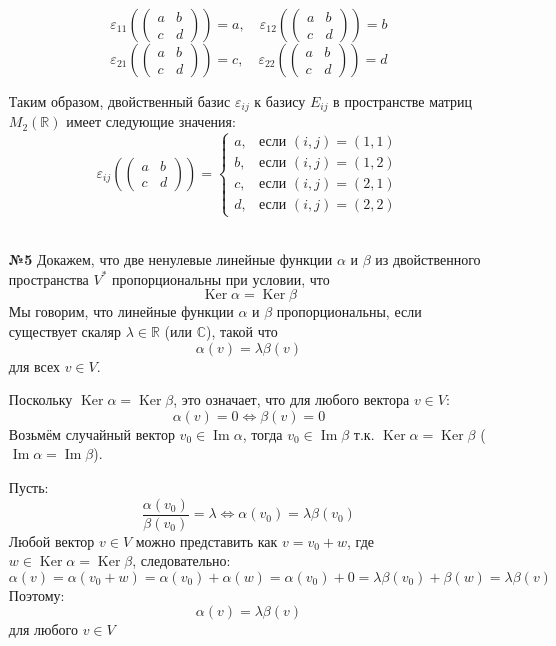 \documentclass[a4paper]{article}
\renewcommand{\f}[2]{\frac{#1}{#2}}
\newcommand{\Ker}[1]{\operatorname{Ker}}
\newcommand{\lr}{\Leftrightarrow}
\renewcommand{\Ker}{\operatorname{Ker}}
\renewcommand{\Im}{\operatorname{Im}}
\begin{document}
\begin{enumerate}
    $$
    \varepsilon_{11}\left(\begin{pmatrix} a & b \\ c & d \end{pmatrix}\right) = a, \quad \varepsilon_{12}\left(\begin{pmatrix} a & b \\ c & d \end{pmatrix}\right) = b
    $$
    $$
    \varepsilon_{21}\left(\begin{pmatrix} a & b \\ c & d \end{pmatrix}\right) = c, \quad \varepsilon_{22}\left(\begin{pmatrix} a & b \\ c & d \end{pmatrix}\right) = d
    $$
    
    Таким образом, двойственный базис $\varepsilon_{ij}$ к базису $E_{ij}$ в пространстве матриц $M_{2}(\mathbb{R})$ имеет следующие значения:
    $$
    \varepsilon_{ij}\left(\begin{pmatrix} a & b \\ c & d \end{pmatrix}\right) = \begin{cases}
    a, & \text{если } (i,j) = (1,1) \\
    b, & \text{если } (i,j) = (1,2) \\
    c, & \text{если } (i,j) = (2,1) \\
    d, & \text{если } (i,j) = (2,2)
    \end{cases}
    $$\\

    \item[\textbf{№5}]Докажем, что две ненулевые линейные функции $\alpha$ и $\beta$ из двойственного пространства $V^*$ пропорциональны при условии, что 
    $$\operatorname{Ker} \alpha = \operatorname{Ker} \beta$$ 
    Мы говорим, что линейные функции $\alpha$ и $\beta$ пропорциональны, если существует скаляр $\lambda \in \mathbb{R}$ (или $\mathbb{C}$), такой что $$\alpha(v) = \lambda \beta(v)$$ для всех $v \in V$.
    
    Поскольку $\operatorname{Ker} \alpha = \operatorname{Ker} \beta$, это означает, что для любого вектора $v \in V$:
    $$
    \alpha(v) = 0 \iff \beta(v) = 0
    $$
    Возьмём случайный вектор $v_0 \in \Im \alpha$, тогда $v_0 \in \Im \beta$ т.к. $\Ker \alpha = \Ker \beta$ ($\Im \alpha = \Im \beta$).

    Пусть:
    $$\f{\alpha(v_0)}{\beta(v_0)} = \lambda \lr \alpha(v_0) = \lambda \beta(v_0)$$
    Любой вектор $v \in V$ можно представить как $v = v_0 + w$, где $w \in \Ker \alpha = \Ker \beta$, следовательно:
    $$\alpha(v) = \alpha(v_0 + w) = \alpha(v_0)+\alpha(w) =\alpha(v_0)+0=  \lambda \beta(v_0) + \beta(w) = \lambda \beta(v)$$
    Поэтому:
    $$\alpha(v) = \lambda \beta(v)$$
    для любого $v \in V$\\


\end{enumerate}
\end{document}
